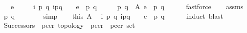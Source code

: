 \begin{isabellebody}
\ \ \ {\isachardoublequoteopen}e\ {\isasymin}\ {\isasymG}{\isachardoublequoteclose}\isanewline
\ \ \ {\isachardoublequoteopen}{\isasymexists}i\ p\ q{\isachardot}{\kern0pt}\ i\isactrlbsup p{\isasymrightarrow}q\isactrlesup \ {\isasymin}\ {\isasymM}\ {\isasymand}\ e\ {\isacharequal}{\kern0pt}\ {\isacharparenleft}{\kern0pt}p{\isacharcomma}{\kern0pt}\ q{\isacharparenright}{\kern0pt}{\isachardoublequoteclose}\isanewline
%
\isadelimproof
%
\endisadelimproof
%
\isatagproof
{}\isamarkupfalse%
\ {\isacharminus}{\kern0pt}\isanewline
\ \ \isamarkupfalse%
\ p\ q\ \ A{\isacharcolon}{\kern0pt}\ {\isachardoublequoteopen}e\ {\isacharequal}{\kern0pt}\ {\isacharparenleft}{\kern0pt}p{\isacharcomma}{\kern0pt}\ q{\isacharparenright}{\kern0pt}{\isachardoublequoteclose}\isanewline
\ \ \ \ \isamarkupfalse%
\ fastforce\isanewline
\ \ \isamarkupfalse%
\ assms\ \isamarkupfalse%
\ {\isachardoublequoteopen}{\isacharparenleft}{\kern0pt}p{\isacharcomma}{\kern0pt}\ q{\isacharparenright}{\kern0pt}\ {\isasymin}\ {\isasymG}{\isachardoublequoteclose}\isanewline
\ \ \ \ \isamarkupfalse%
\ simp\isanewline
\ \ \isamarkupfalse%
\ this\ A\ \isamarkupfalse%
\ {\isachardoublequoteopen}{\isasymexists}i\ p\ q{\isachardot}{\kern0pt}\ i\isactrlbsup p{\isasymrightarrow}q\isactrlesup \ {\isasymin}\ {\isasymM}\ {\isasymand}\ e\ {\isacharequal}{\kern0pt}\ {\isacharparenleft}{\kern0pt}p{\isacharcomma}{\kern0pt}\ q{\isacharparenright}{\kern0pt}{\isachardoublequoteclose}\isanewline
\ \ \ \ \isamarkupfalse%
\ {\isacharparenleft}{\kern0pt}induct{\isacharcomma}{\kern0pt}\ blast{\isacharparenright}{\kern0pt}\isanewline
{}\isamarkupfalse%
%
\endisatagproof
{\isafoldproof}%
%
\isadelimproof
\isanewline
%
\endisadelimproof
\isanewline
{}\isamarkupfalse%
\ Successors\ {\isacharcolon}{\kern0pt}{\isacharcolon}{\kern0pt}\ {\isachardoublequoteopen}{\isacharprime}{\kern0pt}peer\ topology\ {\isasymRightarrow}\ {\isacharprime}{\kern0pt}peer\ {\isasymRightarrow}\ {\isacharprime}{\kern0pt}peer\ set{\isachardoublequoteclose}\ \ {\isacharparenleft}{\kern0pt}{\isachardoublequoteopen}{\isacharunderscore}{\kern0pt}{\isasymlangle}{\isacharunderscore}{\kern0pt}{\isasymrightarrow}{\isasymrangle}{\isachardoublequoteclose}\ {\isacharbrackleft}{\kern0pt}{}{}{\isacharcomma}{\kern0pt}\ {}{}{\isacharbrackright}{\kern0pt}\ {}{}{}{\isacharparenright}{\kern0pt}\ \isanewline

\end{isabellebody}
